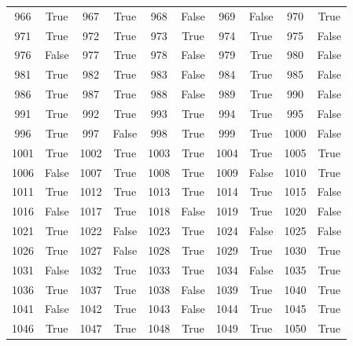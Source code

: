 \begin{longtable}{cc|cc|cc|cc|cc}
966 & True & 967 & True & 968 & False & 969 & False & 970 & True \\
971 & True & 972 & True & 973 & True & 974 & True & 975 & False \\
976 & False & 977 & True & 978 & False & 979 & True & 980 & False \\
981 & True & 982 & True & 983 & False & 984 & True & 985 & False \\
986 & True & 987 & True & 988 & False & 989 & True & 990 & False \\
991 & True & 992 & True & 993 & True & 994 & True & 995 & False \\
996 & True & 997 & False & 998 & True & 999 & True & 1000 & False \\
1001 & True & 1002 & True & 1003 & True & 1004 & True & 1005 & True \\
1006 & False & 1007 & True & 1008 & True & 1009 & False & 1010 & True \\
1011 & True & 1012 & True & 1013 & True & 1014 & True & 1015 & False \\
1016 & False & 1017 & True & 1018 & False & 1019 & True & 1020 & False \\
1021 & True & 1022 & False & 1023 & True & 1024 & False & 1025 & False \\
1026 & True & 1027 & False & 1028 & True & 1029 & True & 1030 & True \\
1031 & False & 1032 & True & 1033 & True & 1034 & False & 1035 & True \\
1036 & True & 1037 & True & 1038 & False & 1039 & True & 1040 & True \\
1041 & False & 1042 & True & 1043 & False & 1044 & True & 1045 & True \\
1046 & True & 1047 & True & 1048 & True & 1049 & True & 1050 & True \\
\bottomrule
\end{longtable}
